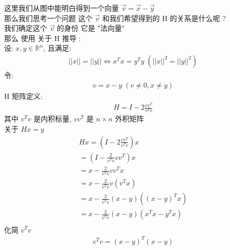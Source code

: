 \documentclass[12pt]{article}
\begin{document}
\begin{flushleft}
\begin{figure}[htbp]
    \end{figure}

    这里我们从图中能明白得到一个向量 $\vec{v} = \vec{x} - \vec{y}$ \\
    那么我们思考一个问题 这个 $\vec{v}$ 和我们希望得到的 H 的关系是什么呢 ? \\
    我们确定这个 $\vec{v}$ 的身份 它是 "法向量" \\
    那么 使用 关于 H 推导 :\\
    设: $x, y \in \mathbb{R}^{n}$, 且满足: \\
    \begin{align}
        ||x|| = ||y||   \Longleftrightarrow  x^{T}x  = y^{T}y \; (||x||^{2} = ||y||^{2})
    \end{align}
    令: \\
    \begin{align}
        v = x - y  \; (v \neq 0, x \neq y)
    \end{align}
    H 矩阵定义: \\
    \begin{align}
        H = I - 2\frac{vv^{T}}{v^{T}v}
    \end{align}
    其中 $v^{T}v$ 是内积标量, $vv^{T}$ 是 $n \times n$ 外积矩阵 \\
    关于 $Hx = y$ \\
    \begin{align}
        Hx = (I - 2\frac{vv^{T}}{v^{T}v})x           \\
        = (I - \frac{2}{v^{T}v}vv^{T})x              \\
        =  x - \frac{2}{v^{T}v}vv^{T}x               \\
        =  x - \frac{2}{v^{T}v}v(v^{T}x)             \\
        =  x - \frac{2}{v^{T}v}(x-y)((x - y)^{T}x)   \\
        = x - \frac{2}{v^{T}v}(x-y)(x^{T}x - y^{T}x) \\
    \end{align}
    化简 $v^{T}v$ \\
    \begin{align}
        v^{T}v = (x - y)^{T}(x - y)                 \\

\end{align}
\end{flushleft}
\end{document}
